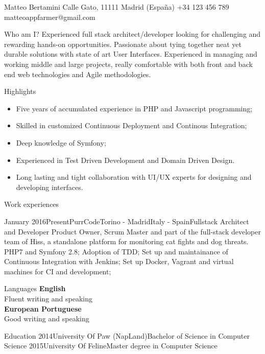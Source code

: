 \documentclass{bertuzcv}
\author{Matteo Bertamini}
\begin{document}
  \header
    {Matteo}
    {Bertamini}
    {Calle Gato, 11111 Madrid (España)}
    {+34 123 456 789}
    {matteoappfarmer@gmail.com}

  \noindent
  \begin{cvbox}{Who am I?}
    Experienced full stack architect/developer looking for challenging and
    rewarding hands-on opportunities. Passionate about tying together
    neat yet durable solutions with state of art User Interfaces. Experienced
    in managing and working middle and large projects, really comfortable with
    both front and back end web technologies and Agile methodologies.
  \end{cvbox}

  \begin{cvbox}{Highlights}
    \begin{itemize}[leftmargin=*,itemsep=-5pt]
        \item Five years of accumulated experience in PHP and Javascript programming;
        \item Skilled in customized Continuous Deployment and Continous Integration;
        \item Deep knowledge of Symfony;
        \item Experienced in Test Driven Development and Domain Driven Design.
        \item Long lasting and tight collaboration with UI/UX experts for designing and developing interfaces.
    \end{itemize}
  \end{cvbox}

  \noindent
  \begin{cvbox}{Work experiences}
    \begin{workExp}{January 2016}{Present}{PurrCode}{Torino - Madrid}{Italy - Spain}{Fullstack Architect and Developer}
      {Product Owner, Scrum Master and part of the full-stack developer team of Hiss, a standalone platform for monitoring cat fights and dog threats.}
      \workDetails
      {PHP7 and Symfony 2.8;}
      {Adoption of TDD;}
      {Set up and maintainance of Continuous Integration with Jenkins;}
      {Set up Docker, Vagrant and virtual machines for CI and development;}
    \end{workExp}
    \vspace{0.6cm}
  \end{cvbox}

  \begin{cvbox}{Languages}
      {%
      \textbf{English}\\
      Fluent writing and speaking
      \\

      \textbf{European Portuguese}\\
      Good writing and speaking}
  \end{cvbox}

  \begin{cvbox}{Education}
    \eduItm
      {2014}{University Of Paw (NapLand)}{Bachelor of Science in Computer Science}
      {2015}{University Of Feline}{Master degree in Computer Science}
  \end{cvbox}
\end{document}
